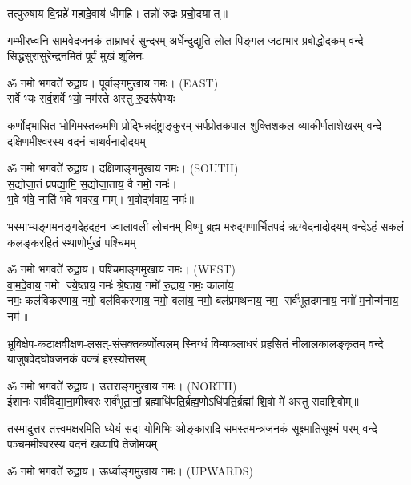 {\small \closesection}

\begin{center}
तत्पुरु॑षाय वि॒द्महे॑ महादे॒वाय॑ धीमहि। तन्नो॑ रुद्रः प्रचो॒दयात्॥

{गम्भीरध्वनि-सामवेदजनकं ताम्राधरं सुन्दरम्}
{अर्धेन्दुद्युति-लोल-पिङ्गल-जटाभार-प्रबोद्धोदकम्}
{वन्दे सिद्धसुरासुरेन्द्रनमितं पूर्वं मुखं शूलिनः}

ॐ नमो भगवते॑ रुद्रा॒य। पूर्वाङ्गमुखाय नमः। {\scriptsize (EAST)}\\[1em]

{सर्वेभ्यः सर्व॒शर्वेभ्यो॒ नम॑स्ते अस्तु रु॒द्ररू॑पेभ्यः}

{कर्णोद्भासित-भोगिमस्तकमणि-प्रोद्भिन्नदंष्ट्राङ्कुरम्}
{सर्पप्रोतकपाल-शुक्तिशकल-व्याकीर्णताशेखरम्}
{वन्दे दक्षिणमीश्वरस्य वदनं चाथर्वनादोदयम्}

ॐ नमो भगवते॑ रुद्रा॒य। दक्षिणाङ्गमुखाय नमः। {\scriptsize (SOUTH)}\\[1em]

स॒द्योजा॒तं प्र॑पद्या॒मि॒ स॒द्योजा॒ताय॒ वै नमो॒ नमः॑।\\
भ॒वे भ॑वे॒ नाति॑ भवे भवस्व॒ माम्। भ॒वोद्भ॑वाय॒ नमः॑॥ 

{भस्माभ्यङ्गमनङ्गदेहदहन-ज्वालावली-लोचनम्}
{विष्णु-ब्रह्म-मरुद्गणार्चितपदं ऋग्वेदनादोदयम्}
{वन्देऽहं सकलं कलङ्करहितं स्थाणोर्मुखं पश्चिमम्}

ॐ नमो भगवते॑ रुद्रा॒य। पश्चिमाङ्गमुखाय नमः। {\scriptsize (WEST)}\\[1em]

वा॒म॒दे॒वाय॒ नमो ज्ये॒ष्ठाय॒ नमः॑ श्रे॒ष्ठाय॒ नमो॑ रु॒द्राय॒ नमः॒ काला॑य॒\\ नमः॒ कल॑विकरणाय॒ नमो॒ बल॑विकरणाय॒ नमो॒ बला॑य॒ नमो॒ बल॑प्रमथनाय॒ नम॒ सर्व॑भूतदमनाय॒ नमो॑ म॒नोन्म॑नाय॒ नम॑॥

{भ्रूविक्षेप-कटाक्षवीक्षण-लसत्-संसक्तकर्णोत्पलम्}
{स्निग्धं विम्बफलाधरं प्रहसितं नीलालकालङ्कृतम्}
{वन्दे याजुषवेदघोषजनकं वक्त्रं हरस्योत्तरम्}

ॐ नमो भगवते॑ रुद्रा॒य। उत्तराङ्गमुखाय नमः। {\scriptsize (NORTH)}\\[1em]

ईशानः सर्व॑विद्या॒ना॒मीश्वरः सर्व॑भूता॒नां॒ ब्रह्माधि॑पति॒र्ब्रह्म॒णोऽधि॑पति॒र्ब्रह्मा॑ शि॒वो मे॑ अस्तु सदाशि॒वोम्॥

{तस्मादुत्तर-तत्त्वमक्षरमिति ध्येयं सदा योगिभिः}
{ओङ्कारादि समस्तमन्त्रजनकं सूक्ष्मातिसूक्ष्मं परम्}
{वन्दे पञ्चममीश्वरस्य वदनं खव्यापि तेजोमयम्}

ॐ नमो भगवते॑ रुद्रा॒य। ऊर्ध्वाङ्गमुखाय नमः। {\scriptsize (UPWARDS)}\\[1em]

\end{center}

